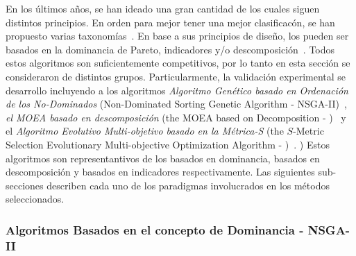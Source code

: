 En los últimos años, se han ideado una gran cantidad de \MOEAS{} los cuales siguen distintos principios.
%
En orden para mejor tener una mejor clasificacón, se han propuesto varias taxonomías~\cite{Joel:BOOK_MOEAs}.
%
En base a sus principios de diseño, los \MOEAS{} pueden ser basados en la dominancia de Pareto, indicadores y/o descomposición~\cite{pilat2010evolutionary}.
%
Todos estos algoritmos son suficientemente competitivos, por lo tanto en esta sección se consideraron \MOEAS{} de distintos grupos.
%
Particularmente, la validación experimental se desarrollo incluyendo a los algoritmos \textit{Algoritmo Genético basado en Ordenación de los No-Dominados} (Non-Dominated Sorting Genetic Algorithm - NSGA-II)~\cite{Joel:NSGAII}, \textit{el MOEA basado en descomposición} (the MOEA based on Decomposition - \MOEAD{})~\cite{Joel:MOEAD} y el \textit{Algoritmo Evolutivo Multi-objetivo basado en la Métrica-S} (the $S$-Metric Selection Evolutionary Multi-objective Optimization Algorithm - \SMSEMOA{})~\cite{Joel:SMSEMOA}.
)
%
Estos algoritmos son representantivos de los basados en dominancia, basados en descomposición y basados en indicadores respectivamente.
%
Las siguientes sub-secciones describen cada uno de los paradigmas involucrados en los métodos seleccionados.

\subsubsection{Algoritmos Basados en el concepto de Dominancia - NSGA-II }

